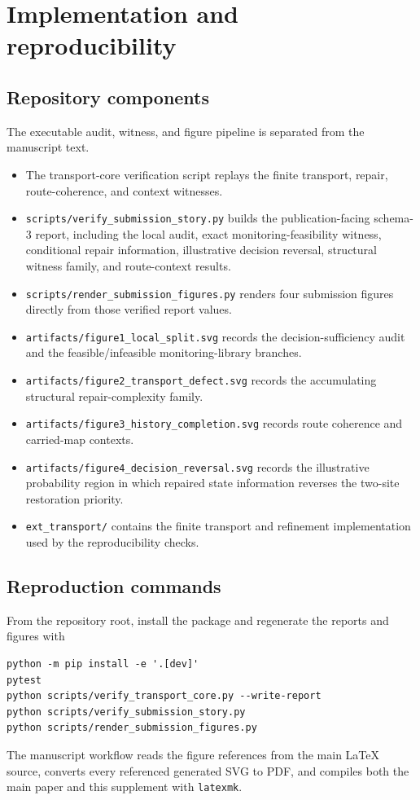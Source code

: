 \section{Implementation and reproducibility}

\subsection{Repository components}
The executable audit, witness, and figure pipeline is separated from the manuscript text.
\begin{itemize}
\item The transport-core verification script replays the finite transport, repair, route-coherence, and context witnesses.
\item \texttt{scripts/verify\_submission\_story.py} builds the publication-facing schema-3 report, including the local audit, exact monitoring-feasibility witness, conditional repair information, illustrative decision reversal, structural witness family, and route-context results.
\item \texttt{scripts/render\_submission\_figures.py} renders four submission figures directly from those verified report values.
\item \texttt{artifacts/figure1\_local\_split.svg} records the decision-sufficiency audit and the feasible/infeasible monitoring-library branches.
\item \texttt{artifacts/figure2\_transport\_defect.svg} records the accumulating structural repair-complexity family.
\item \texttt{artifacts/figure3\_history\_completion.svg} records route coherence and carried-map contexts.
\item \texttt{artifacts/figure4\_decision\_reversal.svg} records the illustrative probability region in which repaired state information reverses the two-site restoration priority.
\item \texttt{ext\_transport/} contains the finite transport and refinement implementation used by the reproducibility checks.
\end{itemize}

\subsection{Reproduction commands}
From the repository root, install the package and regenerate the reports and figures with
\begin{verbatim}
python -m pip install -e '.[dev]'
pytest
python scripts/verify_transport_core.py --write-report
python scripts/verify_submission_story.py
python scripts/render_submission_figures.py
\end{verbatim}
The manuscript workflow reads the figure references from the main \LaTeX{} source, converts every referenced generated SVG to PDF, and compiles both the main paper and this supplement with \texttt{latexmk}.

